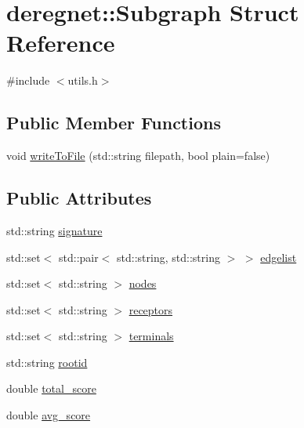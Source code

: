 \hypertarget{structderegnet_1_1Subgraph}{}\section{deregnet\+:\+:Subgraph Struct Reference}
\label{structderegnet_1_1Subgraph}


{\ttfamily \#include $<$utils.\+h$>$}

\subsection*{Public Member Functions}
\begin{DoxyCompactItemize}
\item 
void \hyperlink{structderegnet_1_1Subgraph_ad82c2a1c9c43701b0239f3c32e120d82}{write\+To\+File} (std\+::string filepath, bool plain=false)
\end{DoxyCompactItemize}
\subsection*{Public Attributes}
\begin{DoxyCompactItemize}
\item 
std\+::string \hyperlink{structderegnet_1_1Subgraph_aae642b8b0b71de5539218040b0d7e201}{signature}
\item 
std\+::set$<$ std\+::pair$<$ std\+::string, std\+::string $>$ $>$ \hyperlink{structderegnet_1_1Subgraph_a918a816236f30355b2ec812af629db09}{edgelist}
\item 
std\+::set$<$ std\+::string $>$ \hyperlink{structderegnet_1_1Subgraph_a6f8b8d288c1314cc9623e732c5b89056}{nodes}
\item 
std\+::set$<$ std\+::string $>$ \hyperlink{structderegnet_1_1Subgraph_a2a818ffe02ceced905ef38cb9a5253df}{receptors}
\item 
std\+::set$<$ std\+::string $>$ \hyperlink{structderegnet_1_1Subgraph_a030ed025dd1e2e38c48147283a93bd61}{terminals}
\item 
std\+::string \hyperlink{structderegnet_1_1Subgraph_a0e214a14649dcd35959c619cbdd9ce2b}{rootid}
\item 
double \hyperlink{structderegnet_1_1Subgraph_a3fdd10c0e803822ae09a71e5b549e471}{total\+\_\+score}
\item 
double \hyperlink{structderegnet_1_1Subgraph_ad2836fb4bf0db09a91363f5fc894a02a}{avg\+\_\+score}
\end{DoxyCompactItemize}


